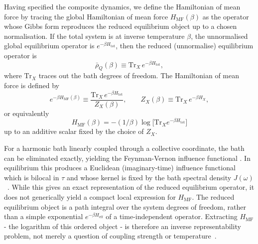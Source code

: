 \documentclass[aps,prl,twocolumn,superscriptaddress,showpacs,floatfix]{revtex4-2}
\newcommand{\Tr}{\mathrm{Tr}}
\begin{document}
Having specified the composite dynamics, we define the Hamiltonian of mean force by tracing the global Hamiltonian of mean force $H_{\mathrm{MF}}(\beta)$ as the operator whose Gibbs
form reproduces the reduced equilibrium object up to a chosen normalisation. If
the total system is at inverse temperature $\beta$, the unnormalised global
equilibrium operator is $e^{-\beta H_{\mathrm{tot}}}$, then the reduced
(unnormalise) equilibrium operator is
\begin{equation}
    \bar{\rho}_Q(\beta)\equiv \Tr_X\, e^{-\beta H_{\mathrm{tot}}},
    \label{eq:reduced_equilibrium_operator}
\end{equation}
where $\Tr_X$ traces out the bath degrees of freedom. The Hamiltonian of mean
force is defined by
\begin{equation}
    e^{-\beta H_{\mathrm{MF}}(\beta)}
    \equiv
    \frac{\Tr_X\, e^{-\beta H_{\mathrm{tot}}}}{Z_X(\beta)},
    \qquad
    Z_X(\beta)\equiv \Tr_X\, e^{-\beta H_X},
    \label{eq:HMF_def}
\end{equation}
or equivalently
\begin{equation}
H_{\mathrm{MF}}(\beta)=-(1/\beta)\log\!\big[\Tr_X e^{-\beta H_{\mathrm{tot}}}\big]
\end{equation}
up to an additive scalar fixed by the choice of $Z_X$.

For a harmonic bath linearly coupled through a collective coordinate, the bath
can be eliminated exactly, yielding the Feynman-Vernon influence functional
\cite{feynmanTheoryGeneralQuantum1963a, grabertQuantumBrownianMotion1988, ingoldSpecificHeatAnomalies2009, hanggiFiniteQuantumDissipation2008}.
In equilibrium this produces a Euclidean (imaginary-time) influence functional
which is bilocal in $\tau$ and whose kernel is fixed by the bath spectral
density $J(\omega)$~\cite{moixEquilibriumreducedDensityMatrix2012, mccaulPartitionfreeApproachOpen2017c, mccaulDrivingSpinbosonModels2018a, mccaulHowWinFriends2021b}. While this gives an exact representation of the reduced equilibrium operator, it does not generically yield a compact local expression for $H_{\mathrm{MF}}$. The reduced equilibrium object is a path integral over the system degrees of freedom, rather than a
simple exponential $e^{-\beta H_{\mathrm{eff}}}$ of a time-independent operator.
Extracting $H_{\mathrm{MF}}$ - the logarithm of this ordered object - is
therefore an inverse representability problem, not merely a question of coupling
strength or temperature~\cite{talknerColloquiumStatisticalMechanics2020, hovhannisyanHamiltonianMeanForce2020}.
\end{document}
